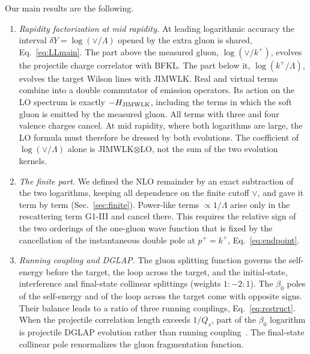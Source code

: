 Our main results are the following.
\begin{enumerate}
\item \emph{Rapidity factorization at mid rapidity.} At leading logarithmic accuracy the interval $\delta Y=\log(\vee/\Lambda)$ opened by the extra gluon is shared, Eq.~\eqref{eq:LLmain}. The part above the measured gluon, $\log(\vee/k^+)$, evolves the projectile charge correlator with BFKL. The part below it, $\log(k^+/\Lambda)$, evolves the target Wilson lines with JIMWLK. Real and virtual terms combine into a double commutator of emission operators. Its action on the LO spectrum is exactly $-H_{\rm JIMWLK}$, including the terms in which the soft gluon is emitted by the measured gluon. All terms with three and four valence charges cancel. At mid rapidity, where both logarithms are large, the LO formula must therefore be dressed by both evolutions. The coefficient of $\log(\vee/\Lambda)$ alone is JIMWLK$\otimes$LO, not the sum of the two evolution kernels.
\item \emph{The finite part.} We defined the NLO remainder by an exact subtraction of the two logarithms, keeping all dependence on the finite cutoff $\vee$, and gave it term by term (Sec.~\ref{sec:finite}). Power-like terms $\propto1/\Lambda$ arise only in the rescattering term G1-III and cancel there. This requires the relative sign of the two orderings of the one-gluon wave function that is fixed by the cancellation of the instantaneous double pole at $p^+=k^+$, Eq.~\eqref{eq:endpoint}.
\item \emph{Running coupling and DGLAP.} The gluon splitting function governs the self-energy before the target, the loop across the target, and the initial-state, interference and final-state collinear splittings (weights $1:-2:1$). The $\beta_0$ poles of the self-energy and of the loop across the target come with opposite signs. Their balance leads to a ratio of three running couplings, Eq.~\eqref{eq:rcstruct}. When the projectile correlation length exceeds $1/Q_s$, part of the $\beta_0$ logarithm is projectile DGLAP evolution rather than running coupling~\cite{Kovner:2023vsy}. The final-state collinear pole renormalizes the gluon fragmentation function.
\end{enumerate}

